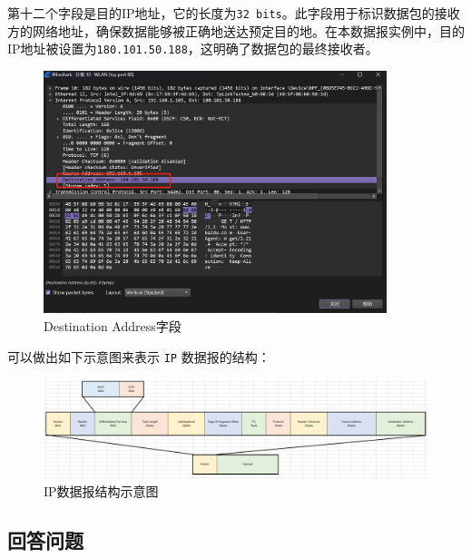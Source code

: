 \documentclass{article}
\begin{document}
	第十二个字段是目的IP地址，它的长度为\texttt{32 bits}。此字段用于标识数据包的接收方的网络地址，确保数据能够被正确地送达预定目的地。在本数据报实例中，目的IP地址被设置为\texttt{180.101.50.188}，这明确了数据包的最终接收者。
	
	\begin{figure}[H]
		\centering
		\includegraphics[width=10cm]{images/19. Destination Address字段.jpg}
		\caption{Destination Address字段}
	\end{figure}
	
	可以做出如下示意图来表示 \texttt{IP} 数据报的结构：
	
	\begin{figure}[H]
		\centering
		\includegraphics[width=18cm]{images/20. IP数据报结构示意图.jpg}
		\caption{IP数据报结构示意图}
	\end{figure}
	
	\subsection{回答问题}
	
\end{document}
